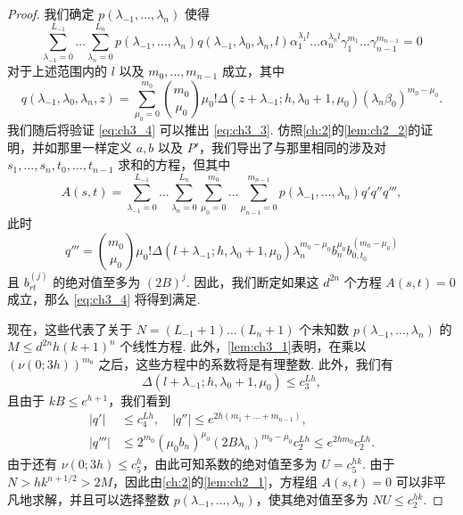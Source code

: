 \begin{proof}
我们确定 $p(\lambda_{-1}, \dots, \lambda_n)$ 使得
\begin{equation} \label{eq:ch3_4}\tag{4}
\sum_{\lambda_{-1}=0}^{L_{-1}} \dots \sum_{\lambda_n=0}^{L_n} p(\lambda_{-1}, \dots, \lambda_n) q(\lambda_{-1}, \lambda_0, \lambda_n, l) \alpha_1^{\lambda_1 l} \dots \alpha_n^{\lambda_n l} \gamma_1^{m_1} \dots \gamma_{n-1}^{m_{n-1}} = 0
\end{equation}
对于上述范围内的 $l$ 以及 $m_0, \dots, m_{n-1}$ 成立，其中
\[
q(\lambda_{-1}, \lambda_0, \lambda_n, z) = \sum_{\mu_0=0}^{m_0} \binom{m_0}{\mu_0} \mu_0! \Delta(z + \lambda_{-1}; h, \lambda_0 + 1, \mu_0) (\lambda_n \beta_0)^{m_0 - \mu_0}.
\]
我们随后将验证 \eqref{eq:ch3_4} 可以推出 \eqref{eq:ch3_3}. 仿照\autoref{ch:2}的\autoref{lem:ch2_2}的证明，并如那里一样定义 $a, b$ 以及 $P'$，我们导出了与那里相同的涉及对 $s_1, \dots, s_n, t_0, \dots, t_{n-1}$ 求和的方程，但其中
\[
A(s,t) = \sum_{\lambda_{-1}=0}^{L_{-1}} \dots \sum_{\lambda_n=0}^{L_n} \sum_{\mu_0=0}^{m_0} \dots \sum_{\mu_{n-1}=0}^{m_{n-1}} p(\lambda_{-1}, \dots, \lambda_n) q' q'' q''',
\]
此时
\[
q''' = \binom{m_0}{\mu_0} \mu_0! \Delta(l+\lambda_{-1}; h, \lambda_0+1, \mu_0) \lambda_n^{m_0-\mu_0} b_n^{\mu_0} b_{0, t_0}^{(m_0-\mu_0)}
\]
且 $b_{rt}^{(j)}$ 的绝对值至多为 $(2B)^j$. 因此，我们断定如果这 $d^{2n}$ 个方程 $A(s,t)=0$ 成立，那么 \eqref{eq:ch3_4} 将得到满足.

现在，这些代表了关于 $N = (L_{-1} + 1) \dots (L_n + 1)$ 个未知数 $p(\lambda_{-1}, \dots, \lambda_n)$ 的 $M \le d^{2n}h(k+1)^n$ 个线性方程. 此外，\autoref{lem:ch3_1}表明，在乘以 $(\nu(0; 3h))^{m_0}$ 之后，这些方程中的系数将是有理整数. 此外，我们有
\[
\Delta(l+\lambda_{-1}; h, \lambda_0+1, \mu_0) \le c_3^{Lh},
\]
且由于 $kB \le e^{h+1}$，我们看到
\begin{align*}
|q'| &\le c_4^{Lh}, \quad |q''| \le e^{2h(m_1 + \dots + m_{n-1})}, \\
|q'''| &\le 2^{m_0} (\mu_0 b_n)^{\mu_0} (2B\lambda_n)^{m_0 - \mu_0} c_2^{Lh} \le e^{2hm_0} c_2^{Lh}.
\end{align*}
由于还有 $\nu(0;3h) \le c_5^h$，由此可知系数的绝对值至多为 $U = c_5^{hk}$. 由于 $N > hk^{n+1/2} > 2M$，因此由\autoref{ch:2}的\autoref{lem:ch2_1}，方程组 $A(s,t)=0$ 可以非平凡地求解，并且可以选择整数 $p(\lambda_{-1}, \dots, \lambda_n)$，使其绝对值至多为 $NU \le c_2^{hk}$.


\end{proof}
